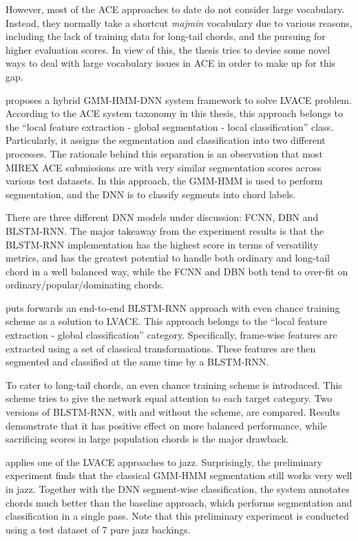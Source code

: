 However, most of the ACE approaches to date do not consider large vocabulary. Instead, they normally take a shortcut \textit{majmin} vocabulary due to various reasons, including the lack of training data for long-tail chords, and the pursuing for higher evaluation scores. In view of this, the thesis tries to devise some novel ways to deal with large vocabulary issues in ACE in order to make up for this gap.

 proposes a hybrid GMM-HMM-DNN system framework to solve LVACE problem. According to the ACE system taxonomy in this thesis, this approach belongs to the ``local feature extraction - global segmentation - local classification'' class. Particularly, it assigns the segmentation and classification into two different processes. The rationale behind this separation is an observation that most MIREX ACE submissions are with very similar segmentation scores across various test datasets. In this approach, the GMM-HMM is used to perform segmentation, and the DNN is to classify segments into chord labels.

There are three different DNN models under discussion: FCNN, DBN and BLSTM-RNN. The major takeaway from the experiment results is that the BLSTM-RNN implementation has the highest score in terms of versatility metrics, and has the greatest potential to handle both ordinary and long-tail chord in a well balanced way, while the FCNN and DBN both tend to over-fit on ordinary/popular/dominating chords.

 puts forwards an end-to-end BLSTM-RNN approach with even chance training scheme as a solution to LVACE. This approach belongs to the ``local feature extraction - global classification'' category. Specifically, frame-wise features are extracted using a set of classical transformations. These features are then segmented and classified at the same time by a BLSTM-RNN.

To cater to long-tail chords, an even chance training scheme is introduced. This scheme tries to give the network equal attention to each target category. Two versions of BLSTM-RNN, with and without the scheme, are compared. Results demonstrate that it has positive effect on more balanced performance, while sacrificing scores in large population chords is the major drawback.

 applies one of the LVACE approaches to jazz. Surprisingly, the preliminary experiment finds that the classical GMM-HMM segmentation still works very well in jazz. Together with the DNN segment-wise classification, the system annotates chords much better than the baseline approach, which performs segmentation and classification in a single pass. Note that this preliminary experiment is conducted using a test dataset of 7 pure jazz backings.

